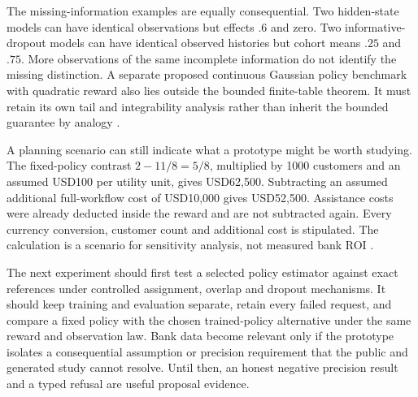 The missing-information examples are equally consequential. Two hidden-state
models can have identical observations but effects $.6$ and zero. Two
informative-dropout models can have identical observed histories but cohort
means $.25$ and $.75$. More observations of the same incomplete information do
not identify the missing distinction. A separate proposed continuous Gaussian
policy benchmark with quadratic reward also lies outside the bounded
finite-table theorem. It must retain its own tail and integrability analysis
rather than inherit the bounded guarantee by analogy
\citep{exec14_servicing_evidence}.

A planning scenario can still indicate what a prototype might be worth studying.
The fixed-policy contrast $2-11/8=5/8$, multiplied by 1000 customers and an
assumed USD100 per utility unit, gives USD62,500. Subtracting an assumed
additional full-workflow cost of USD10,000 gives USD52,500. Assistance costs
were already deducted inside the reward and are not subtracted again. Every
currency conversion, customer count and additional cost is stipulated. The
calculation is a scenario for sensitivity analysis, not measured bank ROI
\citep{exec14_servicing_evidence}.

The next experiment should first test a selected policy estimator against exact
references under controlled assignment, overlap and dropout mechanisms. It
should keep training and evaluation separate, retain every failed request, and
compare a fixed policy with the chosen trained-policy alternative under the same
reward and observation law. Bank data become relevant only if the prototype
isolates a consequential assumption or precision requirement that the public
and generated study cannot resolve. Until then, an honest negative precision
result and a typed refusal are useful proposal evidence.
